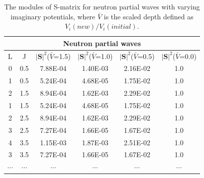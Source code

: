 \begin{table}[]
\centering
\begin{tabular}{cccccc}
\toprule
\toprule
\multicolumn{6}{c}{Neutron partial waves}                                                                         \\
 \midrule
L                     & J                     & $|\mathbf{S}|^2$($\bar{V}$=1.5) & $|\mathbf{S}|^2$($\bar{V}$=1.0) & $|\mathbf{S}|^2$($\bar{V}$=0.5) & $|\mathbf{S}|^2$($\bar{V}$=0.0) \\
0 & 0.5 & 7.88E-04                     & 1.40E-03                     & 2.16E-02                     & 1.0                            \\
1 & 0.5 & 5.24E-04                     & 4.68E-05                     & 1.75E-02                     & 1.0                            \\
2 & 1.5 & 8.94E-04                     & 1.62E-03                     & 2.29E-02                     & 1.0                            \\
1 & 1.5 & 5.24E-04                     & 4.68E-05                     & 1.75E-02                     & 1.0                            \\
2 & 2.5 & 8.94E-04                     & 1.62E-03                     & 2.29E-02                     & 1.0                            \\
3 & 2.5 & 7.27E-04                     & 1.66E-05                     & 1.67E-02                     & 1.0                            \\
4 & 3.5 & 1.15E-03                     & 1.87E-03                     & 2.51E-02                     & 1.0                            \\
3 & 3.5 & 7.27E-04                     & 1.66E-05                     & 1.67E-02                     & 1.0                            \\$\cdots$           &$\cdots$                    & $\cdots$                            & $\cdots$                           & $\cdots$                           & $\cdots$                                                                \\
\bottomrule
\bottomrule
\end{tabular}
\caption{The modules of S-matrix for neutron partial waves with varying imaginary potentials, where $\bar{V}$ is the scaled depth defined as $V_i(new)/V_i(initial)$.}
\label{nSmatrix}
\end{table}

